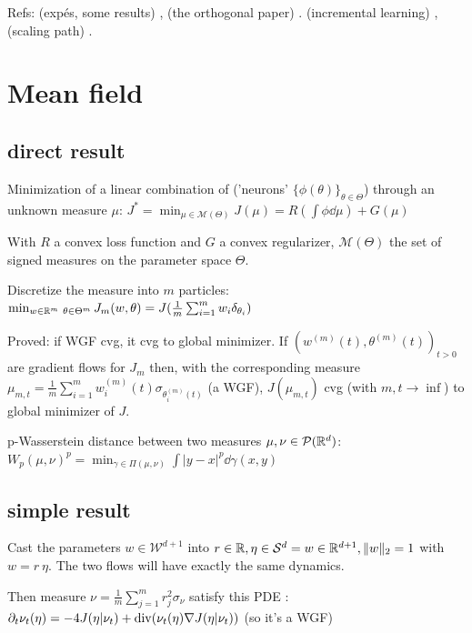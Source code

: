 Refs: (expés, some results) \citep{maennel2018gradient}, (the orthogonal paper) \citep{boursierGradientFlowDynamics2022}. (incremental learning) \citep{berthierIncrementalLearningDiagonal}, (scaling path) \citep{neumayerEffectInitializationScaling2023}.

\section{Mean field}

\subsection{direct result}

Minimization of a linear combination of ('neurons' $\{\phi(\theta)\}_{\theta \in \Theta}$) through an unknown measure $\mu$: $J^* = \min_{\mu \in \mathcal{M}(\Theta)} J(\mu) = R(\int \phi \dd \mu) + G(\mu)$

With $R$ a convex loss function and $G$ a convex regularizer, $\mathcal{M}(\Theta)$ the set of signed measures on the parameter space $\Theta$.

Discretize the measure into $m$ particles: $\min_{w \in \mathbb{R}^m \\\ \theta \in \Theta^m} J_m(w, \theta) = J( \frac{1}{m} \sum_{i=1}^{m} w_i \delta_{\theta_i})$

Proved: if WGF cvg, it cvg to global minimizer. If $(w^{(m)}(t), \theta^{(m)}(t))_{t>0}$ are gradient flows for $J_m$ then, with the corresponding measure $\mu_{m,t} = \frac{1}{m} \sum_{i=1}^{m} w^{(m)}_i(t) \sigma_{\theta_i^{(m)}(t)}$ (a WGF), $J(\mu_{m, t})$ cvg (with $m, t \rightarrow \inf$) to global minimizer of $J$.

p-Wasserstein distance between two measures $\mu, \nu \in \mathcal{P}(\mathbb{R}^d)$: $W_p(\mu, \nu)^p = \min_{\gamma \in \Pi(\mu, \nu)} \int |y - x|^p \dd \gamma(x, y)$

\subsection{simple result}

Cast the parameters $w \in \mathcal{W}^{d+1}$ into $r \in \mathbb{R}, \eta \in \mathcal{S}^d = {w \in \mathbb{R}^{d+1}, \lVert w\rVert_2 = 1}$ with $w = r ~ \eta$. The two flows will have exactly the same dynamics.

Then measure $\nu= \frac{1}{m}\sum_{j=1}^{m} r^2_j \sigma_{\nu}$ satisfy this PDE : $\partial_t \nu_t(\eta) = -4 J(\eta | \nu_t) + \operatorname*{div}(\nu_t(\eta) \nabla J(\eta | \nu_t)) $ (so it's a WGF)

